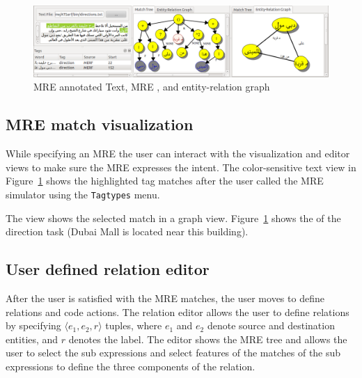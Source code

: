 \begin{figure}[tb!]
  \centering
  \includegraphics[width=\textwidth]{figures/treegraph}
  \caption{MRE annotated Text, MRE , and entity-relation graph}
  \label{fig:treegraph}
\end{figure}

\vspace{-1em}
\subsection{MRE match visualization}

While specifying an MRE the user can interact with the visualization and editor views
to make sure the MRE expresses the intent. 
The color-sensitive text view in Figure~\ref{fig:treegraph} shows 
the highlighted tag matches after the user called the MRE simulator using 
the {\tt Tagtypes} menu. 

The  view shows the selected match in a graph view.
Figure~\ref{fig:treegraph} shows the  of the direction task 
(Dubai Mall is located near this building). 


\subsection{User defined relation editor}

After the user is satisfied with the MRE matches, 
the user moves to define relations and code actions. 
The relation editor allows the user to define relations 
by specifying $\langle e_1,e_2,r\rangle$ tuples, 
where $e_1$ and $e_2$ denote source and destination entities, and $r$ denotes 
the label.
The editor shows the MRE tree and allows the user to select the sub 
expressions and select features 
of the matches of the sub expressions to define the three components of the relation. 

